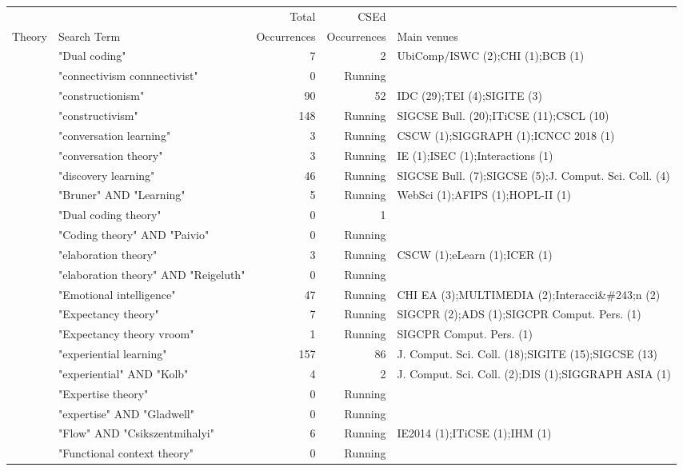 \begin{table*}[t]
\begin{tabular}{lp{7cm}rrp{3cm}}
& & Total & CSEd & \\Theory & Search Term & Occurrences & Occurrences & Main venues\\\hline
& "Dual coding" & 7 & 2 & UbiComp/ISWC (2);CHI  (1);BCB  (1) \\
& "connectivism connnectivist" & 0 & Running &  \\
& "constructionism" & 90 & 52 & IDC  (29);TEI  (4);SIGITE  (3) \\
& "constructivism" & 148 & Running & SIGCSE Bull. (20);ITiCSE  (11);CSCL  (10) \\
& "conversation learning" & 3 & Running & CSCW  (1);SIGGRAPH  (1);ICNCC 2018 (1) \\
& "conversation theory" & 3 & Running & IE  (1);ISEC  (1);Interactions (1) \\
& "discovery learning" & 46 & Running & SIGCSE Bull. (7);SIGCSE  (5);J. Comput. Sci. Coll. (4) \\
& "Bruner" AND "Learning" & 5 & Running & WebSci  (1);AFIPS  (1);HOPL-II (1) \\
& "Dual coding theory" & 0 & 1 &  \\
& "Coding theory" AND "Paivio" & 0 & Running &  \\
& "elaboration theory" & 3 & Running & CSCW  (1);eLearn (1);ICER  (1) \\
& "elaboration theory" AND "Reigeluth" & 0 & Running &  \\
& "Emotional intelligence" & 47 & Running & CHI EA  (3);MULTIMEDIA  (2);Interacci\&\#243;n  (2) \\
& "Expectancy theory" & 7 & Running & SIGCPR  (2);ADS  (1);SIGCPR Comput. Pers. (1) \\
& "Expectancy theory vroom" & 1 & Running & SIGCPR Comput. Pers. (1) \\
& "experiential learning" & 157 & 86 & J. Comput. Sci. Coll. (18);SIGITE  (15);SIGCSE  (13) \\
& "experiential" AND "Kolb" & 4 & 2 & J. Comput. Sci. Coll. (2);DIS  (1);SIGGRAPH ASIA  (1) \\
& "Expertise theory" & 0 & Running &  \\
& "expertise" AND "Gladwell" & 0 & Running &  \\
& "Flow" AND "Csikszentmihalyi" & 6 & Running & IE2014 (1);ITiCSE  (1);IHM  (1) \\
& "Functional context theory" & 0 & Running &  \\

\end{tabular}
\end{table*}
